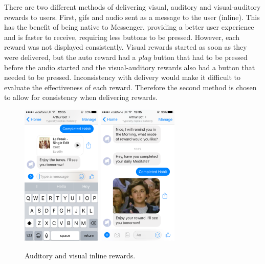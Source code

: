 There are two different methods of delivering visual, auditory and visual-auditory rewards to users. First, gifs and audio sent as a message to the user (inline). This has the benefit of being native to Messenger, providing a better user experience and is faster to receive, requiring less buttons to be pressed. However, each reward was not displayed consistently. Visual rewards started as soon as they were delivered, but the auto reward had a \textit{play} button that had to be pressed before the audio started and the visual-auditory rewards also had a button that needed to be pressed. Inconsistency with delivery would make it difficult to evaluate the effectiveness of each reward. Therefore the second method is chosen to allow for consistency when delivering rewards.

\begin{figure}[H]
  \centering
  \includegraphics[width=1.5in]{../resources/design/reward-audio-inline.png}
  \hspace{10px}
  \includegraphics[width=1.5in]{../resources/design/reward-visual-inline.png}
  \caption{Auditory and visual inline rewards.}
  \label{fig:rewards_inline}
\end{figure}


